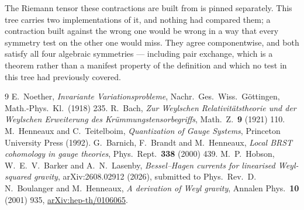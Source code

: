 \documentclass[11pt]{article}
\theoremstyle{definition}
\theoremstyle{remark}
\begin{document}
The Riemann tensor these contractions are built from is pinned separately.  This
tree carries two implementations of it, and nothing had compared them; a
contraction built against the wrong one would be wrong in a way that every
symmetry test on the other one would miss.  They agree componentwise, and both
satisfy all four algebraic symmetries --- including pair exchange, which is a
theorem rather than a manifest property of the definition and which no test in
this tree had previously covered.

\begin{thebibliography}{9}
 E.~Noether,
  \emph{Invariante Variationsprobleme}, Nachr.\ Ges.\ Wiss.\ G\"ottingen,
  Math.-Phys.\ Kl.\ (1918) 235.
 R.~Bach,
  \emph{Zur Weylschen Relativit\"atstheorie und der Weylschen Erweiterung des
  Kr\"ummungstensorbegriffs}, Math.\ Z.\ \textbf{9} (1921) 110.
 M.~Henneaux and C.~Teitelboim,
  \emph{Quantization of Gauge Systems}, Princeton University Press (1992).
 G.~Barnich, F.~Brandt and M.~Henneaux,
  \emph{Local BRST cohomology in gauge theories}, Phys.\ Rept.\ \textbf{338}
  (2000) 439.
 M.~P.~Hobson, W.~E.~V.~Barker and
  A.~N.~Lasenby, \emph{Bessel--Hagen currents for linearised Weyl-squared
  gravity}, arXiv:2608.02912 (2026), submitted to Phys.\ Rev.\ D.
 N.~Boulanger and M.~Henneaux,
  \emph{A derivation of Weyl gravity}, Annalen Phys.\ \textbf{10} (2001) 935,
  \href{https://arxiv.org/abs/hep-th/0106065}{arXiv:hep-th/0106065}.
\end{thebibliography}
\end{document}

